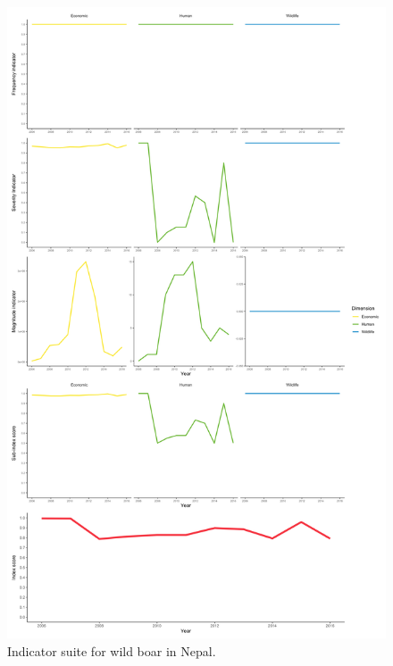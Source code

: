 \documentclass[fleqn,10pt]{olplainarticle}
\begin{document}
\begin{figure}[!ht]
    \centering
    \includegraphics[width = 1\textwidth]{boar_all.png}
    \caption{Indicator suite for wild boar in Nepal.}
    \label{fig:boar}
\end{figure}
\end{document}
